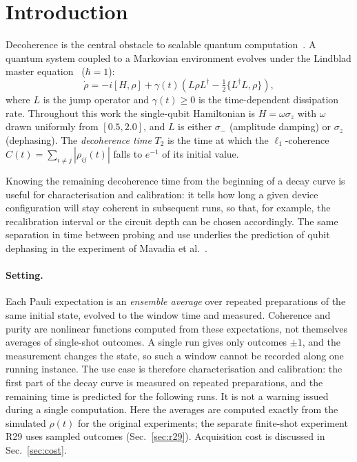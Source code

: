 \documentclass[twocolumn,10pt]{article}
\begin{document}
\section{Introduction}

Decoherence is the central obstacle to scalable quantum
computation~\cite{Zurek2003}.
A quantum system coupled to a Markovian environment evolves under the
Lindblad master equation~\cite{Lindblad1976,Breuer2002} ($\hbar = 1$):
\begin{equation}
  \dot{\rho} = -i[H,\rho]
  + \gamma(t)\!\left(L\rho L^\dagger
    - \tfrac{1}{2}\{L^\dagger L,\rho\}\right),
  \label{eq:lindblad}
\end{equation}
where $L$ is the jump operator and $\gamma(t) \geq 0$ is the
time-dependent dissipation rate.
Throughout this work the single-qubit Hamiltonian is
$H = \omega\sigma_z$ with $\omega$ drawn uniformly from $[0.5, 2.0]$,
and $L$ is either $\sigma_-$ (amplitude damping) or $\sigma_z$
(dephasing).
The \emph{decoherence time} $T_2$ is the time at which the
$\ell_1$-coherence $C(t) = \sum_{i \neq j}|\rho_{ij}(t)|$ falls to
$e^{-1}$ of its initial value.

Knowing the remaining decoherence time from the beginning of a decay
curve is useful for characterisation and calibration: it tells how long a
given device configuration will stay coherent in subsequent runs, so that,
for example, the recalibration interval or the circuit depth can be chosen
accordingly. The same separation in time between probing and use underlies
the prediction of qubit dephasing in the experiment of Mavadia et
al.~\cite{Mavadia2017}.

\paragraph{Setting.}
Each Pauli expectation is an \emph{ensemble average} over repeated
preparations of the same initial state, evolved to the window time and
measured. Coherence and purity are nonlinear functions computed from these
expectations, not themselves averages of single-shot outcomes. A single run gives only outcomes $\pm1$, and the
measurement changes the state, so such a window cannot be recorded along
one running instance. The use case is therefore characterisation and
calibration: the first part of the decay curve is measured on repeated
preparations, and the remaining time is predicted for the following runs.
It is not a warning issued during a single computation. Here the
averages are computed exactly from the simulated $\rho(t)$ for the original
experiments; the separate finite-shot experiment R29 uses sampled outcomes
(Sec.~\ref{sec:r29}). Acquisition cost is discussed in Sec.~\ref{sec:cost}.
\end{document}
